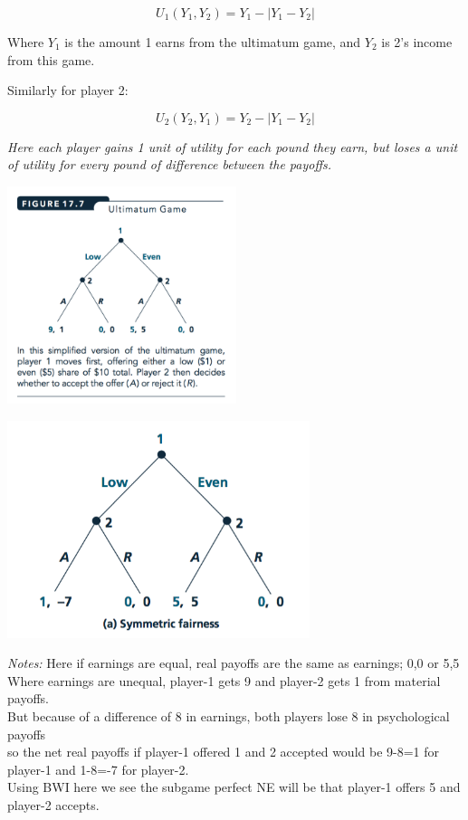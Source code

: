 \documentclass[]{article}
\begin{document}
\bigskip

\[U_1(Y_1,Y_2) = Y_1 - |Y_1-Y_2|\]

\bigskip

Where \(Y_1\) is the amount 1 earns from the ultimatum game, and \(Y_2\)
is 2's income from this game.

\bigskip

Similarly for player 2:

\[U_2(Y_2,Y_1) = Y_2 - |Y_1-Y_2|\]

\bigskip

\emph{Here each player gains 1 unit of utility for each pound they earn,
but loses a unit of utility for every pound of difference between the
payoffs.}

\includegraphics[height=2.5in]{picsfigs/ultimatumgametree.png}

\includegraphics[height=2.5in]{picsfigs/ultimatumfairness.png}

\emph{Notes:} Here if earnings are equal, real payoffs are the same as
earnings; 0,0 or 5,5\\
Where earnings are unequal, player-1 gets 9 and player-2 gets 1 from
material payoffs.\\
But because of a difference of 8 in earnings, both players lose 8 in
psychological payoffs\\
so the net real payoffs if player-1 offered 1 and 2 accepted would be
9-8=1 for player-1 and 1-8=-7 for player-2.\\
Using BWI here we see the subgame perfect NE will be that player-1
offers 5 and player-2 accepts.
\end{document}
